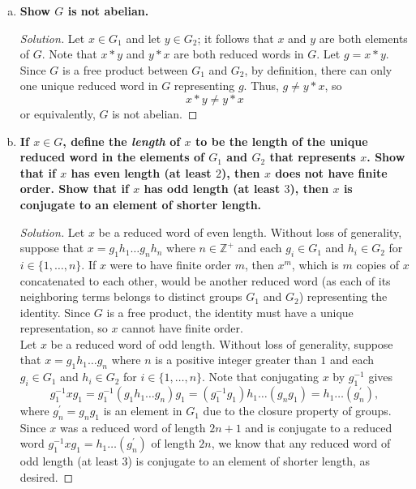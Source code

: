 \documentclass[11pt]{article}
\newcommand{\Z}{\mathbb{Z}}
\newenvironment{solution}
  {\renewcommand\qedsymbol{$\blacksquare$}\begin{proof}[Solution]}
  {\end{proof}}
\begin{document}
\begin{enumerate}[a)]
    \item \textbf{Show $G$ is not abelian.}
    
    \begin{solution}
    
    Let $x \in G_1$ and let $y \in G_2$; it follows that $x$ and $y$ are both elements of $G$. Note that $x * y$ and $y * x$ are both reduced words in $G$. Let $g = x*y$.
    Since $G$ is a free product between $G_1$ and $G_2$, by definition, there can only one unique reduced word in $G$ representing $g$. Thus, $g \neq y * x$, so
    \[
        x * y \neq y * x
    \]
    or equivalently, $G$ is not abelian.
    \end{solution}

    \item \textbf{If $x \in G$, define the \textit{length} of $x$ to be the length of the unique reduced word in the elements of $G_1$ and $G_2$ that represents $x$.
    Show that if $x$ has even length (at least $2$), then $x$ does not have finite order. 
    Show that if $x$ has odd length (at least $3$), then $x$ is conjugate to an element of shorter length.}

    \begin{solution}
    Let $x$ be a reduced word of even length. Without loss of generality, suppose that $x = g_1h_1\dots g_nh_n$ where $n \in \Z^+$ and each $g_i \in G_1$ and $h_i \in G_2$ for $i \in \{ 1, \dots, n \}$.
    If $x$ were to have finite order $m$, then $x^m$, which is $m$ copies of $x$ concatenated to each other, would be another reduced word (as each of its neighboring terms belongs to distinct groups $G_1$ and $G_2$) representing the identity. 
    Since $G$ is a free product, the identity must have a unique representation, so $x$ cannot have finite order. \\

    Let $x$ be a reduced word of odd length. Without loss of generality, suppose that $x = g_1h_1\dots g_n$ where $n$ is a positive integer greater than $1$ and each $g_i \in G_1$ and $h_i \in G_2$ for $i \in \{ 1, \dots, n \}$.
    Note that conjugating $x$ by $g_1^{-1}$ gives
    \[
        g_1^{-1}xg_1 = g_1^{-1} (g_1h_1\dots g_n) g_1 = (g_1^{-1} g_1) h_1\dots (g_n g_1) = h_1 \dots (g^{\prime}_n),
    \]
    where $g^{\prime}_n = g_n g_1$ is an element in $G_1$ due to the closure property of groups. Since $x$ was a reduced word of length $2n+1$ 
    and is conjugate to a reduced word $g_1^{-1}xg_1 = h_1 \dots (g^{\prime}_n)$ of length $2n$,
    we know that any reduced word of odd length (at least $3$) is conjugate to an element of shorter length, as desired.
    \end{solution}
    

\end{enumerate}
\end{document}
